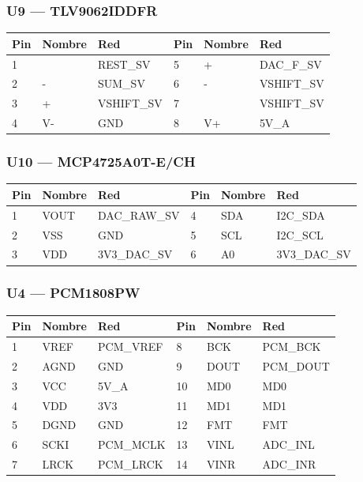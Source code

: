\documentclass[10pt,a4paper]{article}
\begin{document}
\subsubsection*{U9 — TLV9062IDDFR}
{\footnotesize\begin{tabular}{@{}lll|lll@{}}\toprule
\textbf{Pin} & \textbf{Nombre} & \textbf{Red} & \textbf{Pin} & \textbf{Nombre} & \textbf{Red}\\\midrule
1 &  & REST\_\allowbreak{}SV & 5 & + & DAC\_\allowbreak{}F\_\allowbreak{}SV\\
2 & - & SUM\_\allowbreak{}SV & 6 & - & VSHIFT\_\allowbreak{}SV\\
3 & + & VSHIFT\_\allowbreak{}SV & 7 &  & VSHIFT\_\allowbreak{}SV\\
4 & V- & GND & 8 & V+ & 5V\_\allowbreak{}A\\
\bottomrule\end{tabular}}
\subsubsection*{U10 — MCP4725A0T-E/CH}
{\footnotesize\begin{tabular}{@{}lll|lll@{}}\toprule
\textbf{Pin} & \textbf{Nombre} & \textbf{Red} & \textbf{Pin} & \textbf{Nombre} & \textbf{Red}\\\midrule
1 & VOUT & DAC\_\allowbreak{}RAW\_\allowbreak{}SV & 4 & SDA & I2C\_\allowbreak{}SDA\\
2 & VSS & GND & 5 & SCL & I2C\_\allowbreak{}SCL\\
3 & VDD & 3V3\_\allowbreak{}DAC\_\allowbreak{}SV & 6 & A0 & 3V3\_\allowbreak{}DAC\_\allowbreak{}SV\\
\bottomrule\end{tabular}}
\subsubsection*{U4 — PCM1808PW}
{\footnotesize\begin{tabular}{@{}lll|lll@{}}\toprule
\textbf{Pin} & \textbf{Nombre} & \textbf{Red} & \textbf{Pin} & \textbf{Nombre} & \textbf{Red}\\\midrule
1 & VREF & PCM\_\allowbreak{}VREF & 8 & BCK & PCM\_\allowbreak{}BCK\\
2 & AGND & GND & 9 & DOUT & PCM\_\allowbreak{}DOUT\\
3 & VCC & 5V\_\allowbreak{}A & 10 & MD0 & MD0\\
4 & VDD & 3V3 & 11 & MD1 & MD1\\
5 & DGND & GND & 12 & FMT & FMT\\
6 & SCKI & PCM\_\allowbreak{}MCLK & 13 & VINL & ADC\_\allowbreak{}INL\\
7 & LRCK & PCM\_\allowbreak{}LRCK & 14 & VINR & ADC\_\allowbreak{}INR\\
\bottomrule\end{tabular}}
\end{document}
